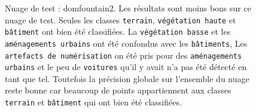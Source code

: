\documentclass[a4paper, onecolumn, 11pt]{article}
\begin{document}
\begin{figure}[h]
    \qquad
    \caption{Nuage de test : domfountain2. Les résultats sont moins bons sur ce nuage de test. Seules les classes \texttt{terrain}, \texttt{végétation haute} et \texttt{bâtiment} ont bien été classifiées. La \texttt{végétation basse} et les \texttt{aménagements urbains} ont été confondus avec les \texttt{bâtiments}, Les \texttt{artefacts de numérisation} on été pris pour des \texttt{aménagements urbains} et le peu de \texttt{voitures} qu'il y avait n'a pas été détecté en tant que tel. Toutefois la précision globale sur l'ensemble du nuage reste bonne car beaucoup de points appartiennent aux classes \texttt{terrain} et \texttt{bâtiment} qui ont bien été classifiées.}
    \label{fig:domfountain2}
\end{figure}
\end{document}
